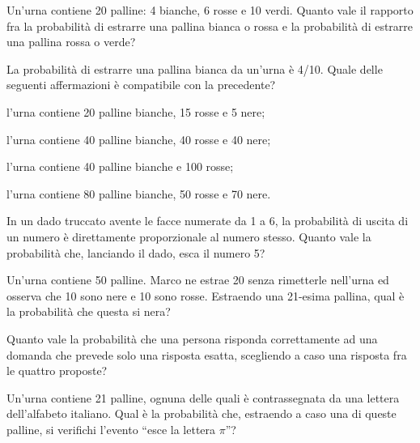 \begin{esercizio} %
Un'urna contiene 20 palline: 4 bianche, 6 rosse e 10 verdi. Quanto vale il rapporto fra la probabilità di estrarre una pallina bianca o rossa e la probabilità di estrarre una pallina rossa o verde?
\end{esercizio}

\begin{esercizio} %
La probabilità di estrarre una pallina bianca da un'urna è 4/10. Quale delle seguenti affermazioni è compatibile con la precedente?
\begin{itemize*}
\item l'urna contiene 20 palline bianche, 15 rosse e 5 nere;
\item l'urna contiene 40 palline bianche, 40 rosse e 40 nere;
\item l'urna contiene 40 palline bianche e 100 rosse;
\item l'urna contiene 80 palline bianche, 50 rosse e 70 nere.
\end{itemize*}
\end{esercizio}

\begin{esercizio} %
In un dado truccato avente le facce numerate da 1 a 6, la probabilità di uscita di un numero è direttamente proporzionale al numero stesso. Quanto vale la probabilità che, lanciando il dado, esca il numero 5?
\end{esercizio}

\begin{esercizio} %
Un'urna contiene 50 palline. Marco ne estrae 20 senza rimetterle nell'urna ed osserva che 10 sono nere e 10 sono rosse. Estraendo una 21-esima pallina, qual è la probabilità che questa si nera?
\end{esercizio}

\begin{esercizio} %
Quanto vale la probabilità che una persona risponda correttamente ad una domanda che prevede solo una risposta esatta, scegliendo a caso una risposta fra le quattro proposte?
\end{esercizio}

\begin{esercizio} %
Un'urna contiene 21 palline, ognuna delle quali è contrassegnata da una lettera dell'alfabeto italiano. Qual è la probabilità che, estraendo a caso una di queste palline, si verifichi l'evento “esce la lettera $ \pi $”?
\end{esercizio}

